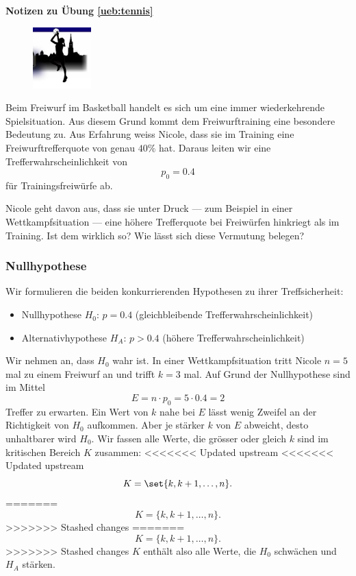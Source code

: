 \documentclass[%
<<<<<<< Updated upstream
<<<<<<< Updated upstream
11pt,%
twoside,%
titlepage,%
german,%
=======
=======
>>>>>>> Stashed changes
11pt,%
twoside,%
titlepage,%
swissgerman,%
<<<<<<< Updated upstream
>>>>>>> Stashed changes
=======
>>>>>>> Stashed changes
headsepline%
]{scrartcl}
\newcommand{\faReturnGray}{\textcolor{gray}{\faMailReply}} %
\theoremstyle{definition}
\theoremstyle{plain}
\newcommand{\concatueb}[1]{ueb:#1}%
\newcommand{\concatlsg}[1]{lsg:#1}%
\newenvironment{lsg}[1]{%
    \par\noindent\textbf{Notizen zu Übung \ref{\concatueb{#1}}}\label{\concatlsg{#1}}
    \hfill\hyperref[\concatueb{#1}]{\faReturnGray}\par %
}{%
    \par%
}
\newcommand{\concatueb}[1]{ueb:#1}%
\newcommand{\concatlsg}[1]{lsg:#1}%
\newenvironment{lsg}[1]{%
    \par\noindent\textbf{Notizen zu Übung \ref{\concatueb{#1}}.}%
    \label{\concatlsg{#1}}
}{%
    \par%
}
\begin{document}
\begin{lsg}{tennis}
\begin{figure}
  \begin{center}
    \includegraphics[width=0.2\textwidth]{pictures/bcfemina}
  \end{center}
\end{figure}

Beim Freiwurf im Basketball handelt es sich um eine immer wiederkehrende Spielsituation. Aus diesem Grund kommt dem Freiwurftraining eine besondere Bedeutung zu. Aus Erfahrung weiss Nicole, dass sie im Training eine Freiwurftrefferquote von genau $40\%$ hat. Daraus leiten wir eine Trefferwahrscheinlichkeit von
$$p_0=0.4$$
für Trainingsfreiwürfe ab.

Nicole geht davon aus, dass sie unter Druck --- zum Beispiel in einer Wettkampfsituation --- eine höhere Trefferquote bei Freiwürfen hinkriegt als im Training. Ist dem wirklich so? Wie lässt sich diese Vermutung belegen?

\subsubsection{Nullhypothese}

Wir formulieren die beiden konkurrierenden Hypothesen zu ihrer Treffsicherheit:

\begin{itemize}
\item Nullhypothese $H_0$: $p=0.4$ (gleichbleibende Trefferwahrscheinlichkeit)
\item Alternativhypothese $H_A$: $p>0.4$ (höhere Trefferwahrscheinlichkeit)
\end{itemize}

Wir nehmen an, dass $H_0$ wahr ist. In einer Wettkampfsituation tritt Nicole $n=5$ mal zu einem Freiwurf an und trifft $k=3$ mal. Auf Grund der Nullhypothese sind im Mittel
$$E=n\cdot p_0=5\cdot0.4=2$$
Treffer zu erwarten. Ein Wert von $k$ nahe bei $E$ lässt wenig Zweifel an der Richtigkeit von $H_0$ aufkommen. Aber je stärker $k$ von $E$ abweicht, desto unhaltbarer wird $H_0$. Wir fassen alle Werte, die grösser oder gleich $k$ sind im kritischen Bereich $K$ zusammen:
<<<<<<< Updated upstream
<<<<<<< Updated upstream
$$K=\set{k,k+1,\dots,n}.$$
=======
$$K=\{k,k+1,\dots,n\}.$$
>>>>>>> Stashed changes
=======
$$K=\{k,k+1,\dots,n\}.$$
>>>>>>> Stashed changes
$K$ enthält also alle Werte, die $H_0$ schwächen und $H_A$ stärken.


\end{lsg}
\end{document}
